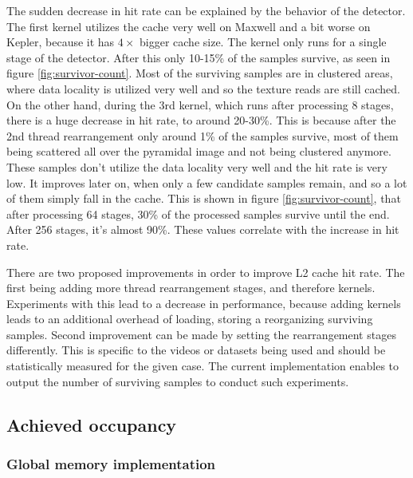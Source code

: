 The sudden decrease in hit rate can be explained by the behavior of the detector. The first kernel utilizes the cache very well on Maxwell and a bit worse on Kepler, because it has $4 \times$ bigger cache size. The kernel only runs for a single stage of the detector. After this only 10-15\% of the samples survive, as seen in figure \ref{fig:survivor-count}. Most of the surviving samples are in clustered areas, where data locality is utilized very well and so the texture reads are still cached. On the other hand, during the 3rd kernel, which runs after processing 8 stages, there is a huge decrease in hit rate, to around 20-30\%. This is because after the 2nd thread rearrangement only around 1\% of the samples survive, most of them being scattered all over the pyramidal image and not being clustered anymore. These samples don't utilize the data locality very well and the hit rate is very low. It improves later on, when only a few candidate samples remain, and so a lot of them simply fall in the cache. This is shown in figure \ref{fig:survivor-count}, that after processing 64 stages, 30\% of the processed samples survive until the end. After 256 stages, it's almost 90\%. These values correlate with the increase in hit rate.

There are two proposed improvements in order to improve L2 cache hit rate. The first being adding more thread rearrangement stages, and therefore kernels. Experiments with this lead to a decrease in performance, because adding kernels leads to an additional overhead of loading, storing a reorganizing surviving samples. Second improvement can be made by setting the rearrangement stages differently. This is specific to the videos or datasets being used and should be statistically measured for the given case. The current implementation enables to output the number of surviving samples to conduct such experiments.

\subsection{Achieved occupancy}\label{subsubsec:ach-occupancy}

\subsubsection{Global memory implementation}\label{subsubsec:occ-global}

